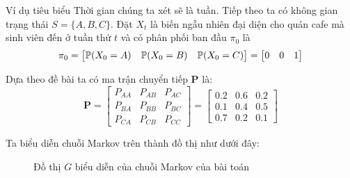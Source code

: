 \begin{frame}{Ví dụ tiêu biểu}
    Thời gian chúng ta xét sẽ là tuần. Tiếp theo ta có không gian trạng thái $S = \{A, B, C \}$. Đặt $X_t$ là biến ngẫu nhiên đại diện cho quán cafe mà sinh viên đến ở tuần thứ $t$ và có phân phối ban đầu $\pi_0$ là
$$
\pi_0 = \begin{bmatrix}
\P(X_0 = A) & \P(X_0 = B) & \P(X_0 = C) 
\end{bmatrix} = \begin{bmatrix}
    0 & 0 & 1
\end{bmatrix}
$$

\noindent Dựa theo đề bài ta có ma trận chuyển tiếp $\mathbf{P}$ là:
$$
\mathbf{P} = \begin{bmatrix}
    P_{AA} & P_{AB} & P_{AC} \\
    P_{BA} & P_{BB} & P_{BC} \\
    P_{CA} & P_{CB} & P_{CC}
\end{bmatrix} = \begin{bmatrix}
    0.2 & 0.6 & 0.2 \\
    0.1 & 0.4 & 0.5 \\
    0.7 & 0.2 & 0.1
\end{bmatrix}
$$

\noindent Ta biểu diễn chuỗi Markov trên thành đồ thị như dưới đây:
\begin{figure}[H]
    \centering
    \caption{Đồ thị $G$ biểu diễn của chuỗi Markov của bài toán} 
    \label{fig:graphprob}
\end{figure}
\end{frame}
